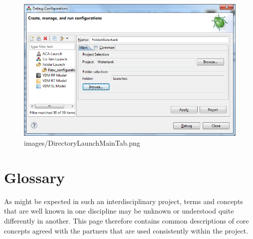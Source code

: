 \documentclass{crescendorepchap}
\begin{document}
\begin{figure}[htbp]
\centering
\includegraphics[width=.6\textwidth]{images/DirectoryLaunchMainTab.png}
\caption{images/DirectoryLaunchMainTab.png}
\label{fig:DirectoryLaunchMainTab}
\end{figure}

\appendix
\newpage


\label{ch:bib} %

\chapter{Glossary}\label{app:Glossary}

As might be expected in such an interdisciplinary project, terms and
concepts that are well known in one discipline may be unknown or
understood quite differently in another. This page therefore contains
common descriptions of core concepts agreed with the partners that are
used consistently within the project.
\end{document}
